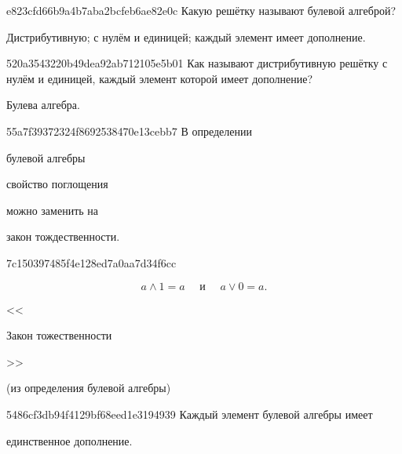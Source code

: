 \begin{note}{e823cfd66b9a4b7aba2bcfeb6ae82e0c}
    Какую решётку называют булевой алгеброй?

    \begin{cloze}{1}
        Дистрибутивную; с нулём и единицей; каждый элемент имеет дополнение.
    \end{cloze}
\end{note}

\begin{note}{520a3543220b49dea92ab712105e5b01}
    Как называют дистрибутивную решётку с нулём и единицей, каждый элемент которой имеет дополнение?

    \begin{cloze}{1}
        Булева алгебра.
    \end{cloze}
\end{note}

\begin{note}{55a7f39372324f8692538470e13cebb7}
    В определении \begin{icloze}{3}булевой алгебры\end{icloze} \begin{icloze}{2}свойство поглощения\end{icloze} можно заменить на \begin{icloze}{1}закон тождественности.\end{icloze}
\end{note}

\begin{note}{7c150397485f4e128ed7a0aa7d34f6cc}
    \begin{icloze}{1}
        \[
            a \land 1 = a \quad \text{ и } \quad a \lor 0 = a.
        \]
    \end{icloze}

    \begin{center}
        \tiny
        <<\begin{icloze}{2}Закон тожественности\end{icloze}>>

        (из определения булевой алгебры)
    \end{center}
\end{note}

\begin{note}{5486cf3db94f4129bf68eed1e3194939}
    Каждый элемент булевой алгебры имеет \begin{icloze}{1}единственное дополнение.\end{icloze}
\end{note}

